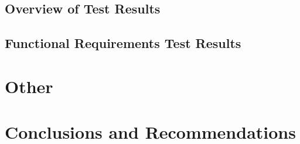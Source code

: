 \documentclass[a4paper,12pt]{article}
\begin{document}
\subsection{Overview of Test Results}
\subsection{Functional Requirements Test Results}

\section{Other}

\section{Conclusions and Recommendations}

%
%
\end{document}

